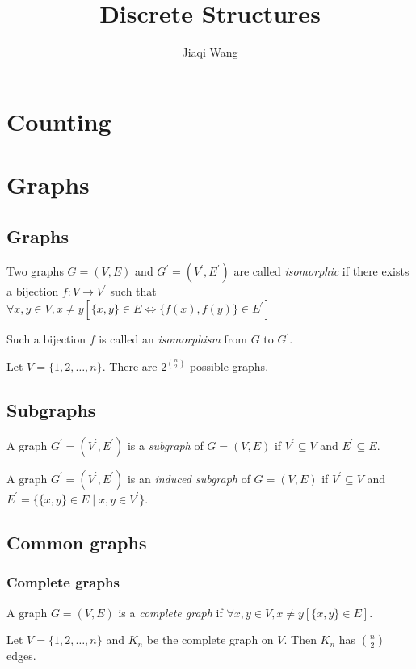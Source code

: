 \documentclass{classnotes}
\author{Jiaqi Wang}
\title{Discrete Structures}
\begin{document}
\maketitle

\section{Counting}

\section{Graphs}
\subsection{Graphs}
\begin{definition}[Isomorhpism]
    Two graphs $G=(V,E)$ and $G^\prime = (V^\prime,E^\prime)$ are called \emph{isomorphic} if there exists a bijection $f: V \to V^\prime$ such that
    $\forall x,y \in V, x \ne y [\{x,y\} \in E \iff \{f(x),f(y)\} \in E^\prime]$

    Such a bijection $f$ is called an \emph{isomorphism} from $G$ to $G^\prime$.
\end{definition}

\begin{theorem}
    Let $V=\{1,2,\dots,n\}$. There are $2^{\binom{n}{2}}$ possible graphs.
\end{theorem}

\subsection{Subgraphs}
\begin{definition}[Subgraph]
    A graph $G^\prime = (V^\prime,E^\prime)$ is a \emph{subgraph} of $G=(V,E)$ if $V^\prime \subseteq V$ and $E^\prime \subseteq E$.
\end{definition}

\begin{definition}
    A graph $G^\prime = (V^\prime,E^\prime)$ is an \emph{induced subgraph} of $G=(V,E)$ if $V^\prime \subseteq V$ and $E^\prime = \{\{x,y\} \in E \mid x,y \in V^\prime\}$.
\end{definition}

\subsection{Common graphs}
\subsubsection*{Complete graphs}
\begin{definition}
    A graph $G=(V,E)$ is a \emph{complete graph} if $\forall x,y \in V, x \ne y [\{x,y\} \in E]$.
\end{definition}
\begin{proposition}
    Let $V = \{1,2,\dots,n\}$ and $K_n$ be the complete graph on $V$. Then $K_n$ has $\binom{n}{2}$ edges.
\end{proposition}
\end{document}
